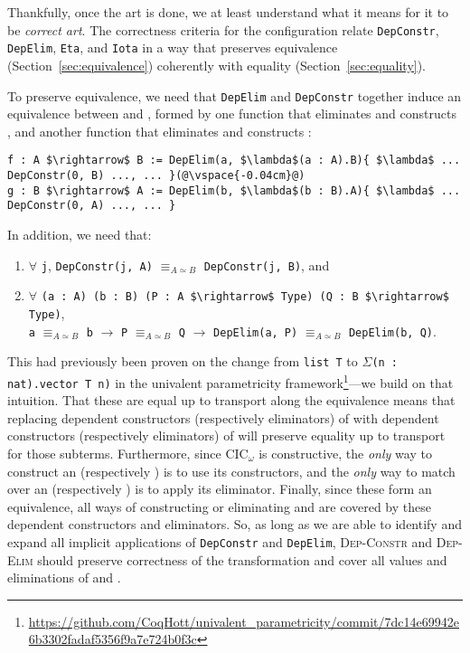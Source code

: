 Thankfully, once the art is done, we at least understand what it means for it to be \textit{correct art}.
The correctness criteria for the configuration relate \lstinline{DepConstr}, \lstinline{DepElim}, \lstinline{Eta}, and \lstinline{Iota}
in a way that preserves equivalence (Section~\ref{sec:equivalence}) coherently with equality (Section~\ref{sec:equality}).

To preserve equivalence, we need that \lstinline{DepElim} and \lstinline{DepConstr} together induce an equivalence between \A and \B,
formed by one function that eliminates \A and constructs \B, and another function that eliminates \B and constructs \A:

\begin{lstlisting}
f : A $\rightarrow$ B := DepElim(a, $\lambda$(a : A).B){ $\lambda$ ... DepConstr(0, B) ..., ... }(@\vspace{-0.04cm}@)
g : B $\rightarrow$ A := DepElim(b, $\lambda$(b : B).A){ $\lambda$ ... DepConstr(0, A) ..., ... }
\end{lstlisting}
In addition, we need that:

\begin{enumerate}
\item $\forall$ \lstinline{j}, \lstinline{DepConstr(j, A)} $\equiv_{A \simeq B}$ \lstinline{DepConstr(j, B)}, and
\item $\forall$ \lstinline{(a : A) (b : B) (P : A $\rightarrow$ Type) (Q : B $\rightarrow$ Type)},\\ \lstinline{a} $\equiv_{A \simeq B}$ \lstinline{b} $\rightarrow$ \lstinline{P} $\equiv_{A \simeq B}$ \lstinline{Q} $\rightarrow$ \lstinline{DepElim(a, P)} $\equiv_{A \simeq B}$ \lstinline{DepElim(b, Q)}.
\end{enumerate}
This had previously been proven on the change from \lstinline{list T} to $\Sigma$\lstinline{(n : nat).vector T n)} in the 
univalent parametricity framework\footnote{\url{https://github.com/CoqHott/univalent_parametricity/commit/7dc14e69942e6b3302fadaf5356f9a7e724b0f3c}}---we build on that intuition.
That these are equal up to transport along the equivalence means that replacing dependent constructors (respectively eliminators) of \A
with dependent constructors (respectively eliminators) of \B will preserve equality up to transport for those subterms.
Furthermore, since CIC$_{\omega}$ is constructive, the \textit{only} way to construct an \A (respectively \B) is to use its constructors,
and the \textit{only} way to match over an \A (respectively \B) is to apply its eliminator.
Finally, since these form an equivalence, all ways of constructing or eliminating \A and \B are covered by these dependent constructors and eliminators.
So, as long as we are able to identify and expand all implicit applications of \lstinline{DepConstr} and \lstinline{DepElim},
\textsc{Dep-Constr} and \textsc{Dep-Elim} should preserve correctness of the transformation and cover all values and eliminations of \A and \B.

